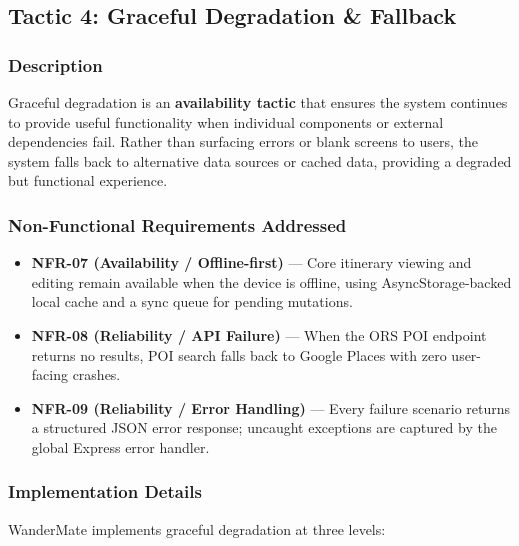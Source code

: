 \documentclass[12pt, a4paper]{article}
\begin{document}
\subsection{Tactic 4: Graceful Degradation \& Fallback}

\subsubsection{Description}

Graceful degradation is an \textbf{availability tactic} that ensures the system continues to provide useful functionality when individual components or external dependencies fail. Rather than surfacing errors or blank screens to users, the system falls back to alternative data sources or cached data, providing a degraded but functional experience.

\subsubsection{Non-Functional Requirements Addressed}

\begin{itemize}
  \item \textbf{NFR-07 (Availability / Offline-first)} --- Core itinerary viewing and editing remain available when the device is offline, using AsyncStorage-backed local cache and a sync queue for pending mutations.
  \item \textbf{NFR-08 (Reliability / API Failure)} --- When the ORS POI endpoint returns no results, POI search falls back to Google Places with zero user-facing crashes.
  \item \textbf{NFR-09 (Reliability / Error Handling)} --- Every failure scenario returns a structured JSON error response; uncaught exceptions are captured by the global Express error handler.
\end{itemize}

\subsubsection{Implementation Details}

WanderMate implements graceful degradation at three levels:
\end{document}
